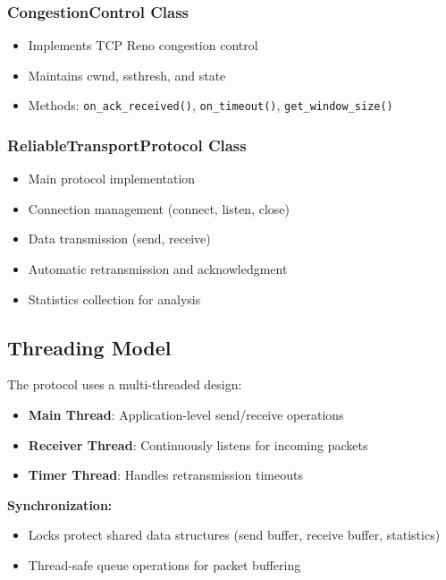\documentclass[11pt,a4paper]{article}
\begin{document}
\subsubsection{CongestionControl Class}
\begin{itemize}
    \item Implements TCP Reno congestion control
    \item Maintains cwnd, ssthresh, and state
    \item Methods: \texttt{on\_ack\_received()}, \texttt{on\_timeout()}, \texttt{get\_window\_size()}
\end{itemize}

\subsubsection{ReliableTransportProtocol Class}
\begin{itemize}
    \item Main protocol implementation
    \item Connection management (connect, listen, close)
    \item Data transmission (send, receive)
    \item Automatic retransmission and acknowledgment
    \item Statistics collection for analysis
\end{itemize}

\subsection{Threading Model}

The protocol uses a multi-threaded design:

\begin{itemize}
    \item \textbf{Main Thread}: Application-level send/receive operations
    \item \textbf{Receiver Thread}: Continuously listens for incoming packets
    \item \textbf{Timer Thread}: Handles retransmission timeouts
\end{itemize}

\textbf{Synchronization:}
\begin{itemize}
    \item Locks protect shared data structures (send buffer, receive buffer, statistics)
    \item Thread-safe queue operations for packet buffering
\end{itemize}
\end{document}
